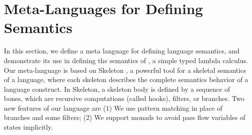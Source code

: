 \section{Meta-Languages for Defining Semantics}\label{sec:host}

In this section, we define a meta language for defining language semantics, and demonstrate its use in defining the semantics of \STLC{}, a simple typed lambda calculus.
Our meta-language is based on Skeleton \cite{skeleton}, a powerful tool 
for a skeletal semantics of a language, where each skeleton describes the complete semantics behavior of a language construct. 
In Skeleton, 
a skeleton body is defined by a sequence of bones,
which are recursive computations (called hooks), filters, or branches.
Two new features of our language are
(1) We use pattern matching in place of branches and some filters;
(2) We support monads to avoid pass flow variables of states implicitly.



